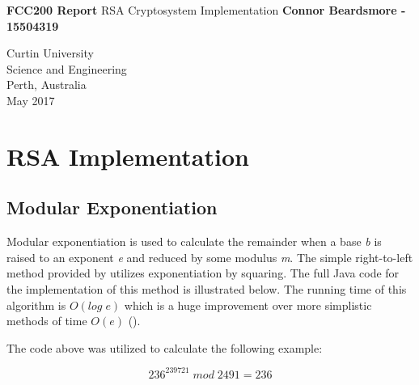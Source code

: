 \documentclass[]{article}
\begin{document}



\begin{titlepage}
	\begin{center}
		\vspace*{1cm}
		\LARGE\textbf{FCC200 Report}
		\break
		RSA Cryptosystem Implementation
		\vspace{1cm}
		\break
		\Large\textbf{Connor Beardsmore - 15504319} 
		\vspace{15cm}

		\normalsize
		Curtin University \\
		Science and Engineering \\
		Perth, Australia \\
	    May 2017
	    
	\end{center}
\end{titlepage}

\vspace*{-0.8cm}
\section*{\hfil RSA Implementation\hfil}

\subsection*{Modular Exponentiation}
\noindent
Modular exponentiation is used to calculate the remainder when a base \textit{b} is raised to an exponent \textit{e} and reduced by some modulus \textit{m}. The simple right-to-left method provided by \cite{alttext} utilizes exponentiation by squaring. The full Java code for the implementation of this method is illustrated below. The running time of this algorithm is $O(log\;e)$ which is a huge improvement over more simplistic methods of time $O(e)$ (\cite{maintext}).

\vspace{0.5cm}
{}

\noindent
The code above was utilized to calculate the following example:

$$236^{239721}\;mod\;2491=236$$

\pagebreak
\end{document}
